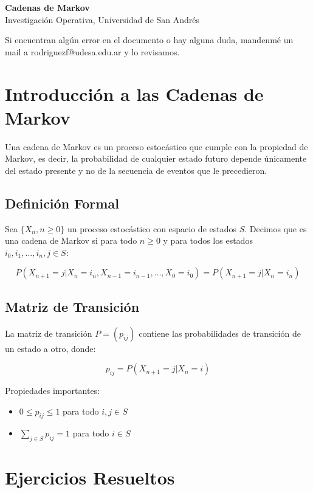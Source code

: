 \documentclass[a4paper,11pt]{article}
\begin{document}
\begin{center}
    {\LARGE \textbf{Cadenas de Markov}}\\[0.5em]
    {Investigación Operativa, Universidad de San Andrés}
\end{center}

Si encuentran algún error en el documento o hay alguna duda, mandenmé un mail a rodriguezf@udesa.edu.ar y lo revisamos.

\section{Introducción a las Cadenas de Markov}

Una cadena de Markov es un proceso estocástico que cumple con la propiedad de Markov, es decir, la probabilidad de cualquier estado futuro depende únicamente del estado presente y no de la secuencia de eventos que le precedieron.

\subsection{Definición Formal}

Sea $\{X_n, n \geq 0\}$ un proceso estocástico con espacio de estados $S$. Decimos que es una cadena de Markov si para todo $n \geq 0$ y para todos los estados $i_0, i_1, ..., i_n, j \in S$:

\[P(X_{n+1} = j | X_n = i_n, X_{n-1} = i_{n-1}, ..., X_0 = i_0) = P(X_{n+1} = j | X_n = i_n)\]

\subsection{Matriz de Transición}

La matriz de transición $P = (p_{ij})$ contiene las probabilidades de transición de un estado a otro, donde:

\[p_{ij} = P(X_{n+1} = j | X_n = i)\]

Propiedades importantes:
\begin{itemize}
    \item $0 \leq p_{ij} \leq 1$ para todo $i,j \in S$
    \item $\sum_{j \in S} p_{ij} = 1$ para todo $i \in S$
\end{itemize}

\section{Ejercicios Resueltos}
\end{document}
